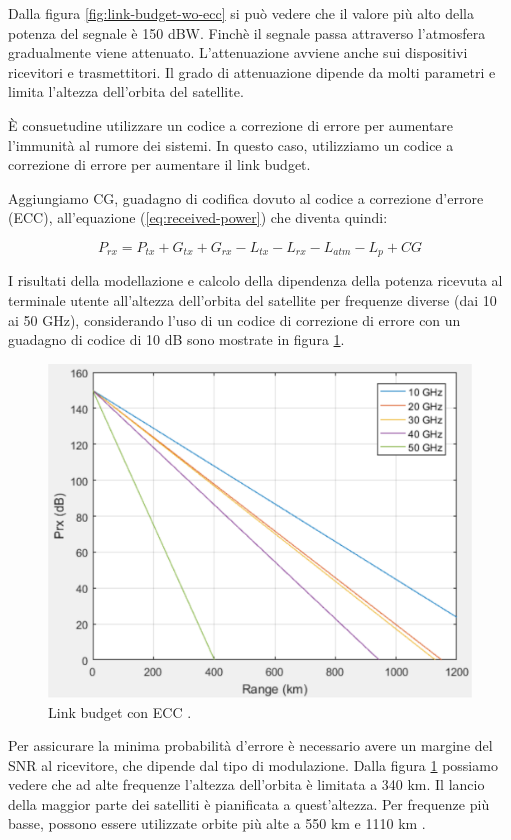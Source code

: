 Dalla figura \ref{fig:link-budget-wo-ecc} si può vedere che il valore più alto della potenza del segnale è 150 dBW.
Finchè il segnale passa attraverso l'atmosfera gradualmente viene attenuato.
L'attenuazione avviene anche sui dispositivi ricevitori e trasmettitori.
Il grado di attenuazione dipende da molti parametri e limita l'altezza dell'orbita del satellite.

È consuetudine utilizzare un codice a correzione di errore per aumentare l'immunità al rumore dei sistemi.
In questo caso, utilizziamo un codice a correzione di errore per aumentare il link budget.

Aggiungiamo CG, guadagno di codifica dovuto al codice a correzione d'errore (\ac{ECC}), all'equazione (\ref{eq:received-power}) che diventa quindi:

\begin{equation}
  P_{rx} = P_{tx} + G_{tx} + G_{rx} - L_{tx} - L_{rx} - L_{atm} - L_{p} + CG
\end{equation}

I risultati della modellazione e calcolo della dipendenza della potenza ricevuta al terminale utente all'altezza dell'orbita del satellite per frequenze diverse (dai 10 ai 50 GHz), considerando l'uso di un codice di correzione di errore con un guadagno di codice di 10 dB sono mostrate in figura \ref{fig:link-budget-w-ecc}.

\begin{figure}[htbp]
  \centering
  \includegraphics[width=0.8\linewidth]{./res/img/link_budget_w_ecc.png}
  \caption{Link budget con \ac{ECC} \cite{rozenvasser_estimation_2023}.}
  \label{fig:link-budget-w-ecc}
\end{figure}

Per assicurare la minima probabilità d'errore è necessario avere un margine del \ac{SNR} al ricevitore, che dipende dal tipo di modulazione.
Dalla figura \ref{fig:link-budget-w-ecc} possiamo vedere che ad alte frequenze l'altezza dell'orbita è limitata a 340 km.
Il lancio della maggior parte dei satelliti è pianificata a quest'altezza.
Per frequenze più basse, possono essere utilizzate orbite più alte a 550 km e 1110 km \cite{rozenvasser_estimation_2023}.

